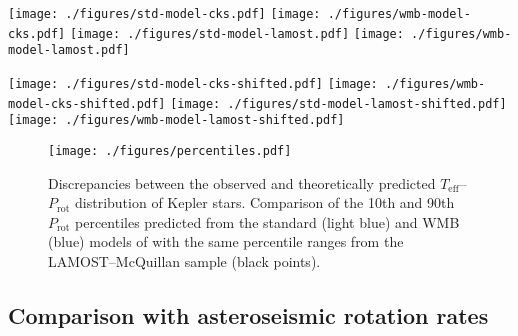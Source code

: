 \documentclass[trackchanges,twocolumn]{aastex631}
\newcommand{\rocrit}{$\mathrm{Ro_{crit}}$\xspace}
\newcommand{\teff}{\ensuremath{T_{\mathrm{eff}}}\xspace}
\newcommand{\logg}{\ensuremath{\log g}\xspace}
\newcommand{\prot}{\ensuremath{P_\mathrm{rot}}\xspace}
\begin{document}
\begin{figure*}
    \centering 
    \texttt{[image: ./figures/std-model-cks.pdf]}
    \texttt{[image: ./figures/wmb-model-cks.pdf]}
    \texttt{[image: ./figures/std-model-lamost.pdf]}
    \texttt{[image: ./figures/wmb-model-lamost.pdf]}
    \caption{The \teff-\prot plane for the CKS sample (top panels) and LAMOST sample (bottom panels) in comparison to the standard and WMB models (2-d histograms) presented in \citet{vanSaders2019}. Shown here are stars with \logg~$>$~4.1. Rotation periods for the CKS sample here are sourced from the \citet{David2021} compilation. The black symbol in each panel indicates the position of the Sun.}
    \label{fig:models}
\end{figure*}


\begin{figure*}
    \centering 
    \texttt{[image: ./figures/std-model-cks-shifted.pdf]}
    \texttt{[image: ./figures/wmb-model-cks-shifted.pdf]}
    \texttt{[image: ./figures/std-model-lamost-shifted.pdf]}
    \texttt{[image: ./figures/wmb-model-lamost-shifted.pdf]}
    \caption{Same as Figure~\ref{fig:models} with constant \teff offsets applied to the data. Shifts of +116~K and +140~K are applied to the CKS and LAMOST \teff, respectively. The CKS \teff shift originates from a least-squares fit of a \rocrit~=~2 curve (with a \teff offset) to the long-period pile-up (as described in \S\ref{subsec:rossby}). The LAMOST shift is derived in a similar fashion, with an additional +34~K offset which represents the systematic offset between CKS and LAMOST (see Appendix~\ref{app:teff}).}
    \label{fig:shifted}
\end{figure*}


\begin{figure}
    \centering
    \texttt{[image: ./figures/percentiles.pdf]}
    \caption{Discrepancies between the observed and theoretically predicted \teff--\prot distribution of Kepler stars. Comparison of the 10th and 90th \prot percentiles predicted from the standard (light blue) and WMB (blue) models of \citet{vanSaders2019} with the same percentile ranges from the LAMOST--McQuillan sample (black points).}
    \label{fig:percentiles}
\end{figure}

\subsection{Comparison with asteroseismic rotation rates}
\label{subsec:asteroseismic}
\end{document}
